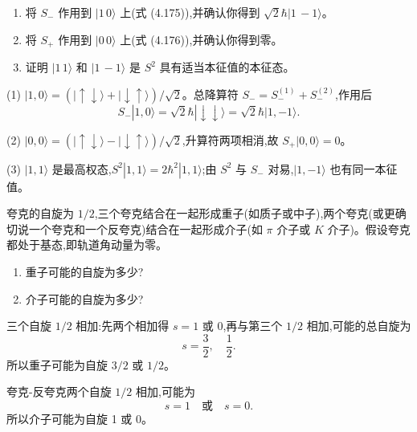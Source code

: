 \begin{question}
\begin{enumerate}
\item 将 $S_-$ 作用到 $|1\,0\rangle$ 上(式 (4.175)),并确认你得到 $\sqrt2\hbar |1\,-1\rangle$。
\item 将 $S_+$ 作用到 $|0\,0\rangle$ 上(式 (4.176)),并确认你得到零。
\item 证明 $|1\,1\rangle$ 和 $|1\,-1\rangle$ 是 $S^2$ 具有适当本征值的本征态。
\end{enumerate}

\par\smallskip
{}

\begin{solution}

(1) $|1,0\rangle=(|\uparrow\downarrow\rangle+|\downarrow\uparrow\rangle)/\sqrt2$。总降算符 $S_-=S_-^{(1)}+S_-^{(2)}$,作用后
\[
S_-|1,0\rangle=\sqrt2\hbar|\downarrow\downarrow\rangle=\sqrt2\hbar|1,-1\rangle.
\]

(2) $|0,0\rangle=(|\uparrow\downarrow\rangle-|\downarrow\uparrow\rangle)/\sqrt2$,升算符两项相消,故 $S_+|0,0\rangle=0$。

(3) $|1,1\rangle$ 是最高权态,$S^2|1,1\rangle=2\hbar^2|1,1\rangle$;由 $S^2$ 与 $S_-$ 对易,$|1,-1\rangle$ 也有同一本征值。

\end{solution}
\end{question}

\begin{question}
夸克的自旋为 $1/2$,三个夸克结合在一起形成重子(如质子或中子),两个夸克(或更确切说一个夸克和一个反夸克)结合在一起形成介子(如 $\pi$ 介子或 $K$ 介子)。假设夸克都处于基态,即轨道角动量为零。
\begin{enumerate}
\item 重子可能的自旋为多少?
\item 介子可能的自旋为多少?
\end{enumerate}
\begin{solution}

三个自旋 $1/2$ 相加:先两个相加得 $s=1$ 或 $0$,再与第三个 $1/2$ 相加,可能的总自旋为
\[
s=\frac32,\quad \frac12.
\]
所以重子可能为自旋 $3/2$ 或 $1/2$。

夸克-反夸克两个自旋 $1/2$ 相加,可能为
\[
s=1\quad \text{或}\quad s=0.
\]
所以介子可能为自旋 1 或 0。

\end{solution}
\end{question}

